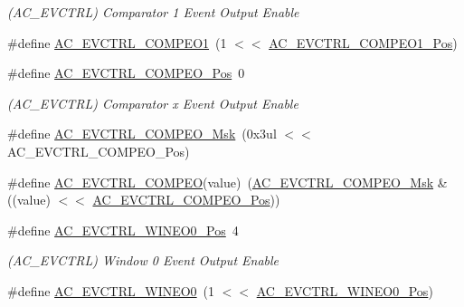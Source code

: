 \begin{DoxyCompactItemize}
\begin{DoxyCompactList}\small\item\em (A\+C\+\_\+\+E\+V\+C\+T\+RL) Comparator 1 Event Output Enable \end{DoxyCompactList}\item 
\#define \mbox{\hyperlink{group___s_a_m_d21___a_c_ga5cf87217a788d7a9dc14292b95754e6b}{A\+C\+\_\+\+E\+V\+C\+T\+R\+L\+\_\+\+C\+O\+M\+P\+E\+O1}}~(1 $<$$<$ \mbox{\hyperlink{group___s_a_m_d21___a_c_ga2a8ed3ce927004e2e47d23ece31c48be}{A\+C\+\_\+\+E\+V\+C\+T\+R\+L\+\_\+\+C\+O\+M\+P\+E\+O1\+\_\+\+Pos}})
\item 
\#define \mbox{\hyperlink{group___s_a_m_d21___a_c_ga9a60df9204a6150ee4ce9fc489666d9d}{A\+C\+\_\+\+E\+V\+C\+T\+R\+L\+\_\+\+C\+O\+M\+P\+E\+O\+\_\+\+Pos}}~0
\begin{DoxyCompactList}\small\item\em (A\+C\+\_\+\+E\+V\+C\+T\+RL) Comparator x Event Output Enable \end{DoxyCompactList}\item 
\#define \mbox{\hyperlink{group___s_a_m_d21___a_c_gaa2bc0028969cfae7d019b84e77c42bc8}{A\+C\+\_\+\+E\+V\+C\+T\+R\+L\+\_\+\+C\+O\+M\+P\+E\+O\+\_\+\+Msk}}~(0x3ul $<$$<$ A\+C\+\_\+\+E\+V\+C\+T\+R\+L\+\_\+\+C\+O\+M\+P\+E\+O\+\_\+\+Pos)
\item 
\#define \mbox{\hyperlink{group___s_a_m_d21___a_c_ga8566809233283aa65406fdcbcb10c306}{A\+C\+\_\+\+E\+V\+C\+T\+R\+L\+\_\+\+C\+O\+M\+P\+EO}}(value)~(\mbox{\hyperlink{group___s_a_m_d21___a_c_gaa2bc0028969cfae7d019b84e77c42bc8}{A\+C\+\_\+\+E\+V\+C\+T\+R\+L\+\_\+\+C\+O\+M\+P\+E\+O\+\_\+\+Msk}} \& ((value) $<$$<$ \mbox{\hyperlink{group___s_a_m_d21___a_c_ga9a60df9204a6150ee4ce9fc489666d9d}{A\+C\+\_\+\+E\+V\+C\+T\+R\+L\+\_\+\+C\+O\+M\+P\+E\+O\+\_\+\+Pos}}))
\item 
\#define \mbox{\hyperlink{group___s_a_m_d21___a_c_ga0e39ab9106d32a5826c0b03c25f0f010}{A\+C\+\_\+\+E\+V\+C\+T\+R\+L\+\_\+\+W\+I\+N\+E\+O0\+\_\+\+Pos}}~4
\begin{DoxyCompactList}\small\item\em (A\+C\+\_\+\+E\+V\+C\+T\+RL) Window 0 Event Output Enable \end{DoxyCompactList}\item 
\#define \mbox{\hyperlink{group___s_a_m_d21___a_c_ga122e442c93867ad67c16f2bbc35e11b6}{A\+C\+\_\+\+E\+V\+C\+T\+R\+L\+\_\+\+W\+I\+N\+E\+O0}}~(1 $<$$<$ \mbox{\hyperlink{group___s_a_m_d21___a_c_ga0e39ab9106d32a5826c0b03c25f0f010}{A\+C\+\_\+\+E\+V\+C\+T\+R\+L\+\_\+\+W\+I\+N\+E\+O0\+\_\+\+Pos}})
\item 

\end{DoxyCompactItemize}
